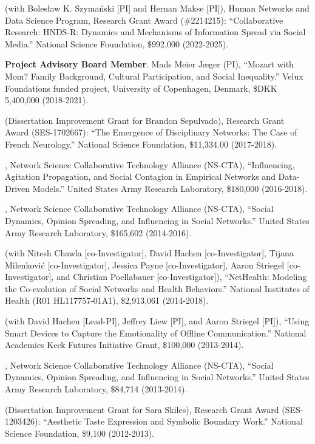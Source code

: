 
 (with Boles\l{}aw K. Szyma\'{n}ski [PI] and Hernan Makse [PI]), Human Networks and Data Science Program, Research Grant Award (\#2214215): ``Collaborative Research: HNDS-R: Dynamics and Mechanisms of Information Spread via Social Media.'' National Science Foundation, \$992,000 (2022-2025).

\ind\textbf{Project Advisory Board Member}. Mads Meier Jæger (PI), ``Mozart with Mom? Family Background, Cultural Participation, and Social Inequality.'' Velux Foundations funded project, University of Copenhagen, Denmark, \$DKK 5,400,000 (2018-2021).

 (Dissertation Improvement Grant for Brandon Sepulvado), Research Grant Award (SES-1702667): ``The Emergence of Disciplinary Networks: The Case of French Neurology.'' National Science Foundation, \$11,334.00 (2017-2018).

, Network Science Collaborative Technology Alliance (NS-CTA), ``Influencing, Agitation Propagation, and Social Contagion in Empirical Networks and Data-Driven Models.'' United States Army Research Laboratory, \$180,000 (2016-2018).

, Network Science Collaborative Technology Alliance (NS-CTA), ``Social Dynamics, Opinion Spreading, and Influencing in Social Networks.'' United States Army Research Laboratory, \$165,602 (2014-2016).

 (with Nitesh Chawla [co-Investigator], David Hachen [co-Investigator], Tijana Milenkovi\'{c} [co-Investigator], Jessica Payne [co-Investigator], Aaron Striegel [co-Investigator], and Christian Poellabauer [co-Investigator]), ``NetHealth: Modeling the Co-evolution of Social Networks and Health Behaviors.'' National Institutes of Health (R01 HL117757-01A1), \$2,913,061 (2014-2018).
 
 (with  David Hachen [Lead-PI], Jeffrey Liew [PI], and Aaron Striegel [PI]), ``Using Smart Devices to Capture the Emotionality of Offline Communication.'' National Academies Keck Futures Initiative Grant, \$100,000 (2013-2014).

, Network Science Collaborative Technology Alliance (NS-CTA), ``Social Dynamics, Opinion Spreading, and Influencing in Social Networks.'' United States Army Research Laboratory, \$84,714 (2013-2014).

 (Dissertation Improvement Grant for Sara Skiles), Research Grant Award (SES-1203426): ``Aesthetic Taste Expression and Symbolic Boundary Work.''  National Science Foundation, \$9,100 (2012-2013).

